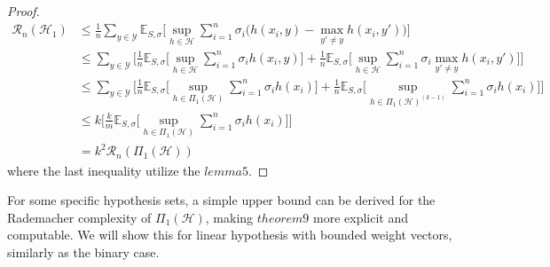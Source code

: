 \begin{proof}
\begin{align}
	\mathcal{R}_n(\mathcal{H}_1) &\leq \frac{1}{n}\sum_{y\in\mathcal{Y}}\mathbb{E}_{S,\sigma}\bigg[\sup_{h \in \mathcal{H}}\sum_{i=1}^{n}\sigma_i \big( h(x_i,y) - \max_{y'\ne y}h(x_i,y')\big)\bigg] \\
	&\leq \sum_{y\in \mathcal{Y}}\bigg[ \frac{1}{n}\mathbb{E}_{S,\sigma}\bigg[\sup_{h \in \mathcal{H}}\sum_{i=1}^{n}\sigma_i h(x_i,y)\bigg] + \frac{1}{n}\mathbb{E}_{S,\sigma}\bigg[\sup_{h \in \mathcal{H}}\sum_{i=1}^{n} \sigma_i \max_{y'\ne y}h(x_i,y')\bigg]\bigg] \\
	&\leq \sum_{y\in \mathcal{Y}}\bigg[\frac{1}{n}\mathbb{E}_{S,\sigma}\bigg[\sup_{h \in \Pi_1(\mathcal{H})}\sum_{i=1}^{n}\sigma_i h(x_i)\bigg] + \frac{1}{n}\mathbb{E}_{S,\sigma}\bigg[\sup_{h \in \Pi_1(\mathcal{H})^{(k-1)}} \sum_{i=1}^{n}\sigma_i h(x_i)\bigg]\bigg]\\
	&\leq k\bigg[\frac{k}{m} \mathbb{E}_{S,\sigma}\bigg[\sup_{h \in \Pi_1(\mathcal{H})}\sum_{i=1}^{n}\sigma_i h(x_i)\bigg]\bigg]\\
	&= k^2\mathcal{R}_n(\Pi_1(\mathcal{H}))
	\end{align}
	where the last inequality utilize the $lemma5$.
\end{proof}
For some specific hypothesis sets, a simple upper bound can be derived for the
Rademacher complexity of $\Pi_1(\mathcal{H})$, making $theorem9$ more explicit and computable. We will show this for linear hypothesis with bounded weight vectors, similarly as the binary case.\\

